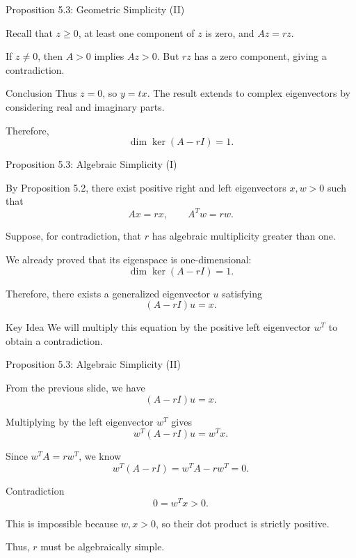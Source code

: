 \documentclass{beamer}
\begin{document}
\begin{frame}{Proposition 5.3: Geometric Simplicity (II)}
\small

Recall that $z\geq0$, at least one component of $z$ is zero, and $Az=rz$.

If $z\neq0$, then $A>0$ implies $Az>0$.
But $rz$ has a zero component,
giving a contradiction.

\begin{block}{Conclusion}
Thus $z=0$, so $y=tx$.
The result extends to complex eigenvectors
by considering real and imaginary parts.

Therefore,
\[
\boxed{\dim\ker(A-rI)=1.}
\]
\end{block}
\end{frame}

\begin{frame}{Proposition 5.3: Algebraic Simplicity (I)}
\small

By Proposition 5.2, there exist positive
right and left eigenvectors $x,w>0$ such that
\[
Ax=rx,\qquad A^Tw=rw.
\]

Suppose, for contradiction, that $r$
has algebraic multiplicity greater than one.

We already proved that its eigenspace is
one-dimensional:
\[
\dim\ker(A-rI)=1.
\]

Therefore, there exists a generalized
eigenvector $u$ satisfying
\[
(A-rI)u=x.
\]

\begin{block}{Key Idea}
We will multiply this equation by the
positive left eigenvector $w^T$ to
obtain a contradiction.
\end{block}
\end{frame}

\begin{frame}{Proposition 5.3: Algebraic Simplicity (II)}
\small

From the previous slide, we have
\[
(A-rI)u=x.
\]

Multiplying by the left eigenvector $w^T$ gives
\[
w^T(A-rI)u=w^Tx.
\]

Since $w^TA=rw^T$, we know
\[
w^T(A-rI)=w^TA-rw^T=0.
\]

\begin{block}{Contradiction}
\[
\boxed{0=w^Tx>0.}
\]

This is impossible because $w,x>0$,
so their dot product is strictly positive.

Thus, $r$ must be algebraically simple.
\end{block}
\end{frame}
\end{document}
